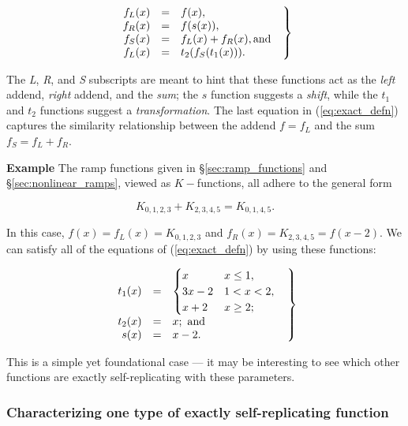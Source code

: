 \documentclass[20pt,]{extarticle}
\newenvironment{densearray}{\begin{array}{rcl}}{\end{array}}
\begin{document}
\begin{equation}\eqnset{\begin{densearray}
  f_L(x)&=&f(x), \\
  f_R(x)&=&f(s(x)), \\
  f_S(x)&=&f_L(x) + f_R(x), \text{and} \\
  f_L(x)&=&t_2(f_S(t_1(x))).
\end{densearray}}\label{eq:exact_defn}\end{equation}

The \emph{L}, \emph{R}, and \emph{S} subscripts are meant to hint that
these functions act as the \emph{left} addend, \emph{right} addend, and
the \emph{sum}; the \(s\) function suggests a \emph{shift}, while the
\(t_1\) and \(t_2\) functions suggest a \emph{transformation}. The last
equation in (\ref{eq:exact_defn}) captures the similarity relationship
between the addend \(f = f_L\) and the sum \(f_S = f_L + f_R\).

\textbf{Example} The ramp functions given in §\ref{sec:ramp_functions}
and §\ref{sec:nonlinear_ramps}, viewed as \(K-\)functions, all adhere to
the general form

\[K_{0,1,2,3} + K_{2,3,4,5} = K_{0,1,4,5}.\]

In this case, \(f(x) = f_L(x) = K_{0,1,2,3}\) and
\(f_R(x) = K_{2,3,4,5} = f(x-2)\). We can satisfy all of the equations
of (\ref{eq:exact_defn}) by using these functions:

\begin{equation}\eqnset{\begin{densearray}
t_1(x) & = &
\begin{cases}
  x              &   x \le 1,       \\
  3x - 2         &   1 < x < 2,   \\
  x + 2          &   x \ge 2; \\
\end{cases}\\
t_2(x) & = & x; \text{ and} \\
s(x)   & = & x - 2. \\
\end{densearray}}\label{eq:s_t1_t2}\end{equation}

This is a simple yet foundational case --- it may be interesting to see
which other functions are exactly self-replicating with these
parameters.

\subsubsection{Characterizing one type of exactly self-replicating
function}\label{characterizing-one-type-of-exactly-self-replicating-function}
\end{document}
